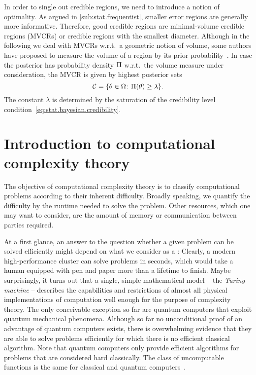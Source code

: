 In order to single out  credible regions, we need to introduce a notion of optimality.
As argued in \cref{sub:stat.frequentist}, smaller error regions are generally more informative.
Therefore, good credible regions are minimal-volume credible regions (MVCRs) or credible regions with the smallest diameter.
Although in the following we deal with MVCRs w.r.t.\ a geometric notion of volume, some authors have proposed to measure the volume of a region by its prior probability~\cite{Evans_2006_Optimally,Shang_2013_Optimal}.
In case the posterior has probability density $\Pi$ w.r.t.\ the volume measure under consideration, the MVCR is given by highest posterior sets~\cite{Ferrie_2014_High}
\[
  \label{eq:stat.bayesian.mvcr}
  \mathcal{C} = \{ \theta \in \Omega\colon \Pi(\theta) \ge \lambda \}.
\]
The constant $\lambda$ is determined by the saturation of the credibility level condition~\eqref{eq:stat.bayesian.credibility}.




\section{Introduction to computational complexity theory}%
\label{sec:error.complexity}

The objective of computational complexity theory is to classify computational problems according to their inherent difficulty.
Broadly speaking, we quantify the difficulty by the runtime needed to solve the problem.
Other resources, which one may want to consider, are the amount of memory or communication between parties required.

At a first glance, an answer to the question whether a given problem can be solved efficiently might depend on what we consider as a :
Clearly, a modern high-performance cluster can solve problems in seconds, which would take a human equipped with pen and paper more than a lifetime to finish.
Maybe surprisingly, it turns out that a single, simple mathematical model -- the \emph{Turing machine} -- describes the capabilities and restrictions of almost all physical implementations of computation well enough for the purpose of complexity theory.
The only conceivable exception so far are quantum computers that exploit quantum mechanical phenomena.
Although so far no unconditional proof of an advantage of quantum computers exists, there is overwhelming evidence that they are able to solve problems efficiently for which there is no efficient classical algorithm.
Note that quantum computers only provide efficient algorithms for problems that are considered hard classically.
The class of uncomputable functions is the same for classical and quantum computers~\cite{Arora_2009_Computational}.




